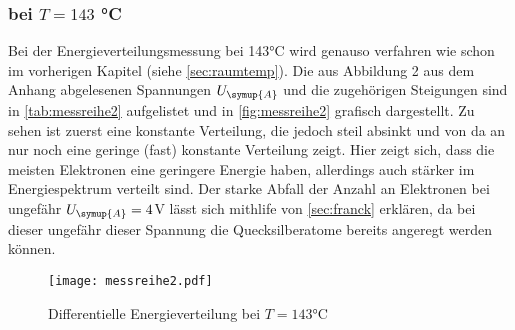         \subsubsection{bei $T = 143$ °C}
        Bei der Energieverteilungsmessung bei 143°C wird genauso verfahren wie schon im vorherigen Kapitel (siehe \autoref{sec:raumtemp}).
        Die aus Abbildung 2 aus dem Anhang abgelesenen Spannungen $U_{\symup{A}}$ und die zugehörigen Steigungen sind in \autoref{tab:messreihe2} aufgelistet
        und in \autoref{fig:messreihe2} grafisch dargestellt. Zu sehen ist zuerst eine konstante Verteilung, die jedoch steil absinkt und von da an nur noch eine
        geringe (fast) konstante Verteilung zeigt. Hier zeigt sich, dass die meisten Elektronen eine geringere Energie haben, allerdings auch stärker
        im Energiespektrum verteilt sind. Der starke Abfall der Anzahl an Elektronen bei ungefähr $U_{\symup{A}} = 4$V lässt sich mithlife von 
        \autoref{sec:franck} erklären, da bei dieser ungefähr dieser Spannung die Quecksilberatome bereits angeregt werden können.
        
         \begin{figure}
          \centering
          \texttt{[image: messreihe2.pdf]}
          \caption{Differentielle Energieverteilung bei $T = 143$°C}
          \label{fig:messreihe2}
        \end{figure}

